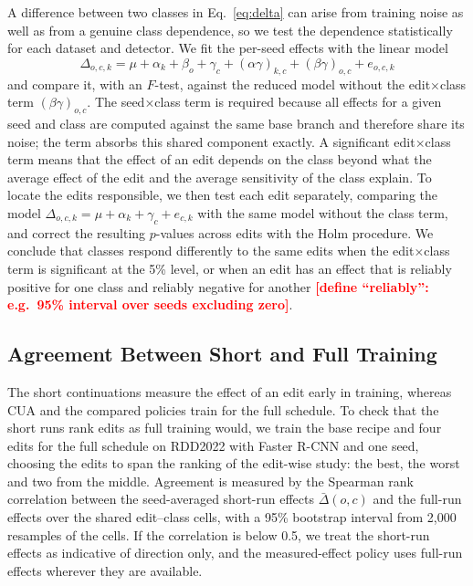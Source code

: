 \documentclass[conference]{IEEEtran}
\newcommand{\todo}[1]{\textcolor{red}{\textbf{[#1]}}}
\begin{document}
A difference between two classes in Eq.~\eqref{eq:delta} can arise from training noise as well as from a genuine class dependence, so we test the dependence statistically for each dataset and detector. We fit the per-seed effects with the linear model
\begin{equation}
\Delta_{o,c,k}=\mu+\alpha_k+\beta_o+\gamma_c+(\alpha\gamma)_{k,c}+(\beta\gamma)_{o,c}+e_{o,c,k}
\label{eq:anova}
\end{equation}
and compare it, with an $F$-test, against the reduced model without the edit$\times$class term $(\beta\gamma)_{o,c}$. The seed$\times$class term is required because all effects for a given seed and class are computed against the same base branch and therefore share its noise; the term absorbs this shared component exactly. A significant edit$\times$class term means that the effect of an edit depends on the class beyond what the average effect of the edit and the average sensitivity of the class explain. To locate the edits responsible, we then test each edit separately, comparing the model $\Delta_{o,c,k}=\mu+\alpha_k+\gamma_c+e_{c,k}$ with the same model without the class term, and correct the resulting $p$-values across edits with the Holm procedure. We conclude that classes respond differently to the same edits when the edit$\times$class term is significant at the 5\% level, or when an edit has an effect that is reliably positive for one class and reliably negative for another \todo{define ``reliably'': e.g.\ 95\% interval over seeds excluding zero}.

\subsection{Agreement Between Short and Full Training}
\label{sec:measure_proxy}

The short continuations measure the effect of an edit early in training, whereas CUA and the compared policies train for the full schedule. To check that the short runs rank edits as full training would, we train the base recipe and four edits for the full schedule on RDD2022 with Faster R-CNN and one seed, choosing the edits to span the ranking of the edit-wise study: the best, the worst and two from the middle. Agreement is measured by the Spearman rank correlation between the seed-averaged short-run effects $\bar\Delta(o,c)$ and the full-run effects over the shared edit--class cells, with a 95\% bootstrap interval from 2,000 resamples of the cells. If the correlation is below 0.5, we treat the short-run effects as indicative of direction only, and the measured-effect policy uses full-run effects wherever they are available.
\end{document}
